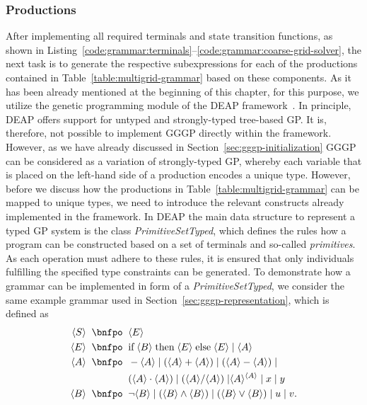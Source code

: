 \subsubsection{Productions}
After implementing all required terminals and state transition functions, as shown in Listing~\ref{code:grammar:terminals}--\ref{code:grammar:coarse-grid-solver}, the next task is to generate the respective subexpressions for each of the productions contained in Table~\ref{table:multigrid-grammar} based on these components.
As it has been already mentioned at the beginning of this chapter, for this purpose, we utilize the genetic programming module of the DEAP framework~\cite{rainville2012deap}. 
In principle, DEAP offers support for untyped and strongly-typed tree-based GP.
It is, therefore, not possible to implement GGGP directly within the framework. 
However, as we have already discussed in Section~\ref{sec:gggp-initialization} GGGP can be considered as a variation of strongly-typed GP, whereby each variable that is placed on the left-hand side of a production encodes a unique type.
However, before we discuss how the productions in Table~\ref{table:multigrid-grammar} can be mapped to unique types, we need to introduce the relevant constructs already implemented in the framework.
In DEAP the main data structure to represent a typed GP system is the class \emph{PrimitiveSetTyped}, which defines the rules how a program can be constructed based on a set of terminals and so-called \emph{primitives}.
As each operation must adhere to these rules, it is ensured that only individuals fulfilling the specified type constraints can be generated.
To demonstrate how a grammar can be implemented in form of a \emph{PrimitiveSetTyped}, we consider the same example grammar used in Section~\ref{sec:gggp-representation}, which is defined as
\begin{equation*}
	\begin{split}
		\ps S \; \; \bnfpo & \; \; \ps E \\
		\ps E \; \; \bnfpo & \; \; \text{if} \; \ps B \; \text{then} \; \ps E \; \text{else} \; \ps E \; | \; \ps A \\
		\ps A \; \; \bnfpo & \; \; -\ps A \; | \; (\ps A + \ps A) \; | \; (\ps A - \ps A) \; | \\
		& \; \; (\ps A \cdot \ps A) \; | \; (\ps A / \ps A) \; | \ps{A}^{\ps{A}} \; | \; x \; | \; y \\  
		\ps B \; \; \bnfpo & \; \;  \neg \ps B \; | \; (\ps B \wedge \ps B) \; | \; (\ps B \vee \ps B) \; | \; u \; | \; v.
	\end{split}
\end{equation*}
